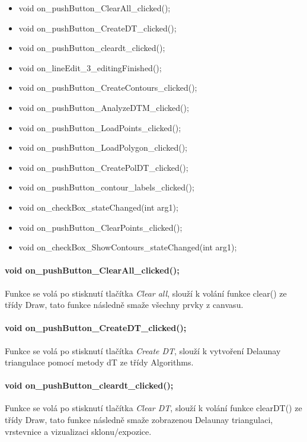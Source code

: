 \documentclass[11pt]{article}
\begin{document}
\begin{itemize}
	\item void on\_pushButton\_ClearAll\_clicked();
	\item void on\_pushButton\_CreateDT\_clicked();
	\item void on\_pushButton\_cleardt\_clicked();
	\item void on\_lineEdit\_3\_editingFinished();
	\item void on\_pushButton\_CreateContours\_clicked();
	\item void on\_pushButton\_AnalyzeDTM\_clicked();
	\item void on\_pushButton\_LoadPoints\_clicked();
	\item void on\_pushButton\_LoadPolygon\_clicked();
	\item void on\_pushButton\_CreatePolDT\_clicked();
	\item void on\_pushButton\_contour\_labels\_clicked();
	\item void on\_checkBox\_stateChanged(int arg1);
	\item void on\_pushButton\_ClearPoints\_clicked();
	\item void on\_checkBox\_ShowContours\_stateChanged(int arg1);
\end{itemize}

\paragraph {void on\_pushButton\_ClearAll\_clicked();}
Funkce se volá po stisknutí tlačítka \textit{Clear all}, slouží k volání funkce clear() ze třídy Draw, tato funkce následně smaže všechny prvky z canvasu.

\paragraph {void on\_pushButton\_CreateDT\_clicked();}
Funkce se volá po stisknutí tlačítka \textit{Create DT}, slouží k vytvoření Delaunay triangulace pomocí metody dT ze třídy Algorithms.

\paragraph {void on\_pushButton\_cleardt\_clicked();}
Funkce se volá po stisknutí tlačítka \textit{Clear DT}, slouží k volání funkce clearDT() ze třídy Draw, tato funkce následně smaže zobrazenou Delaunay triangulaci, vrstevnice a vizualizaci sklonu/expozice.
\end{document}
